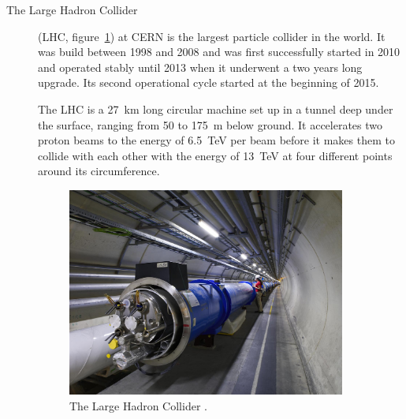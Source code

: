 \begin{description}
\item[The Large Hadron Collider]
\label{subsec:lhc}
(LHC, figure~\ref{fig:lhc}) at CERN is the largest particle collider in the world. It was build between 1998 and 2008 and was first successfully started in 2010 and operated stably until 2013 when it underwent a two years long upgrade. Its second operational cycle started at the beginning of 2015.

The LHC is a 27~km long circular machine set up in a tunnel deep under the surface, ranging from 50 to 175~m below ground. It accelerates two proton beams to the energy of 6.5~TeV per beam before it makes them to collide with each other with the energy of 13~TeV at four different points around its circumference. 
\begin{figure}[!t]
\centering
\includegraphics[width=0.9\textwidth]{01_introduction/pics/lhc}
\caption{The Large Hadron Collider \cite{Maximilien:1324852}.}
\label{fig:lhc}
\end{figure}

\end{description}
